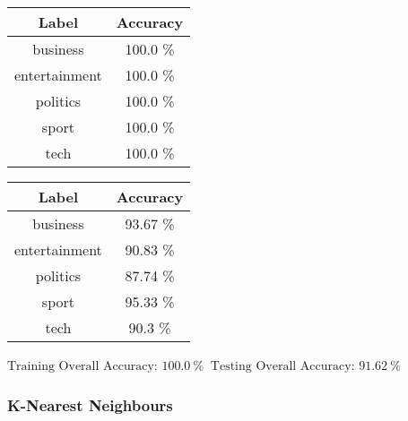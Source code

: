 \documentclass[8pt]{extarticle}
\begin{document}
    \begin{center}
        \begin{tabular}{cc}
            \hline
            Label & Accuracy\\
            \hline
            business &   100.0 \% \\
       entertainment &   100.0 \% \\
           politics  &   100.0 \% \\
              sport  &   100.0 \% \\
               tech  &   100.0 \%
         \end{tabular}
         \quad
        \begin{tabular}{cc}
            \hline
            Label & Accuracy\\
            \hline
            business &   93.67 \% \\
        entertainment &  90.83 \% \\
           politics  &   87.74 \% \\
              sport  &   95.33  \% \\
               tech  &   90.3 \%
        \end{tabular}
    \end{center}
    \begin{center}
        $\displaystyle \text{Training Overall Accuracy:\ }100.0\ \%$
        $\displaystyle \ \text{Testing Overall Accuracy:\ }91.62\ \%$
    \end{center}
    \hypertarget{k-nearest-neighbours}{%
\subsubsection{K-Nearest Neighbours}\label{k-nearest-neighbours}}
\end{document}
